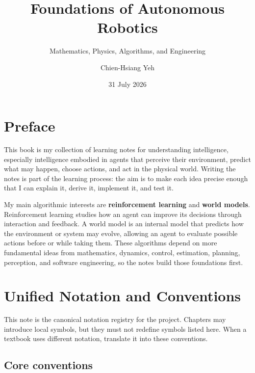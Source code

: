 \documentclass[
  australian,
  12pt,
  letterpaper,
  DIV=11,
  numbers=noendperiod,
  twoside]{scrreprt}
\title{Foundations of Autonomous Robotics}
\subtitle{Mathematics, Physics, Algorithms, and Engineering}
\author{Chien-Hsiang Yeh}
\date{31 July 2026}
\renewcommand*\contentsname{Table of contents}
\newcommand\contentsname{Table of contents}
\begin{document}
\maketitle

\renewcommand*\contentsname{Table of contents}
{
\setcounter{tocdepth}{2}
\tableofcontents
}


\chapter*{Preface}\label{preface}


This book is my collection of learning notes for understanding
intelligence, especially intelligence embodied in agents that perceive
their environment, predict what may happen, choose actions, and act in
the physical world. Writing the notes is part of the learning process:
the aim is to make each idea precise enough that I can explain it,
derive it, implement it, and test it.

My main algorithmic interests are \textbf{reinforcement learning} and
\textbf{world models}. Reinforcement learning studies how an agent can
improve its decisions through interaction and feedback. A world model is
an internal model that predicts how the environment or system may
evolve, allowing an agent to evaluate possible actions before or while
taking them. These algorithms depend on more fundamental ideas from
mathematics, dynamics, control, estimation, planning, perception, and
software engineering, so the notes build those foundations first.


\chapter*{Unified Notation and
Conventions}\label{unified-notation-and-conventions}


This note is the canonical notation registry for the project. Chapters
may introduce local symbols, but they must not redefine symbols listed
here. When a textbook uses different notation, translate it into these
conventions.

\section*{Core conventions}\label{core-conventions}
\end{document}

